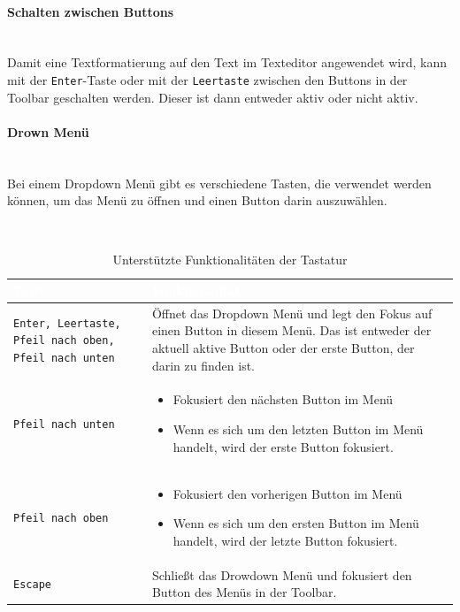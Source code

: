 \paragraph{Schalten zwischen Buttons}\mbox{}\\
Damit eine Textformatierung auf den Text im Texteditor angewendet wird, kann mit der \texttt{Enter}-Taste oder mit 
der \texttt{Leertaste} zwischen den Buttons in der Toolbar geschalten werden. Dieser ist dann entweder aktiv oder 
nicht aktiv.

\paragraph{Drown Menü}\mbox{}\\
Bei einem Dropdown Menü gibt es verschiedene Tasten, die verwendet werden können, um das Menü zu öffnen und einen Button darin auszuwählen.
 
 ~\begin{table}[H]
	\begin{center}
	\begin{tabular}{| m{4cm} | m{10cm} |}
		\hline
 		\cellcolor{Gray}\textcolor{White}{Taste} & \cellcolor{Gray}\textcolor{White}{Funktionalität}  \\
		\hline
		\texttt{Enter, Leertaste, Pfeil nach oben, Pfeil nach unten} & Öffnet das Dropdown Menü und legt den 
			Fokus auf einen Button in diesem Menü. Das ist entweder der aktuell aktive Button oder der erste 
			Button, der darin zu finden ist. \\
		\hline
		\texttt{Pfeil nach unten} &
		\begin{itemize}
			\item Fokusiert den nächsten Button im Menü
			\item Wenn es sich um den letzten Button im Menü handelt, wird der erste Button fokusiert.
		\end{itemize} \\
		\hline
		\texttt{Pfeil nach oben} &
		\begin{itemize}
			\item Fokusiert den vorherigen Button im Menü
			\item Wenn es sich um den ersten Button im Menü handelt, wird der letzte Button fokusiert.
		\end{itemize} \\
		\hline
		\texttt{Escape} & Schließt das Drowdown Menü und fokusiert den Button des Menüs in der Toolbar. \\
		\hline
	\end{tabular}
	\end{center}
	\caption{Unterstützte Funktionalitäten der Tastatur}
\end{table}

